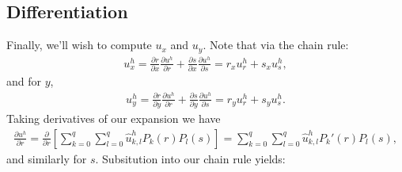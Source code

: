 \documentclass{article}
\newcommand{\pdiff}[2]{\frac{\partial {#1}}{\partial {#2}}}
\begin{document}
\subsection{Differentiation}
Finally, we'll wish to compute $u_x$ and $u_y$. Note that via the chain rule:
  \begin{align*}
    u_x^h = \pdiff{r}{x}\pdiff{u^h}{r}  + \pdiff{s}{x}\pdiff{u^h}{s} = r_x u_r^h + s_x u_s^h,
  \end{align*}
and for $y$,
  \begin{align*}
    u_y^h = \pdiff{r}{y}\pdiff{u^h}{r}  + \pdiff{s}{y}\pdiff{u^h}{s} = r_y u_r^h + s_y u_s^h.
  \end{align*}
Taking derivatives of our expansion we have 
  \begin{align*}
    \pdiff{u^h}{r} = \pdiff{}{r}\left[ \sum_{k = 0}^q \sum_{l = 0}^q \hat{u}_{k,l}^h P_k(r)P_l(s) \right] = \sum_{k = 0}^q \sum_{l = 0}^q \hat{u}_{k,l}^h P_k'(r)P_l(s),
  \end{align*}
and similarly for $s$. Subsitution into our chain rule yields:
\end{document}
